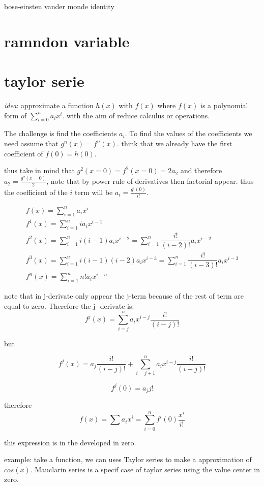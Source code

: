 \documentclass[10pt,a4paper]{article}
\begin{document}
bose-einsten
vander monde identity 


\section{ramndon variable }




\section{taylor serie}
\emph{idea}: approximate a function $h(x)$
with $f(x)$ where $f(x)$ is  a polynomial form of $\sum_{i=0}^{n} a_{i}x^{i}$. with the aim of reduce calculus or operations.

The challenge is find the coefficients $a_{i}$. To find the  values of the coefficients  we need assume that $g^{n}(x) = f^{n}(x)$. think that we already have the first coefficient of $f(0) = h(0)$.


thus take in mind that $g^{2}(x=0) = f^{2}(x=0) = 2a_{2}$ and therefore $a_{2} = \frac{ g^{2}(x=0) }{2}$, note that by power rule of derivatives then factorial appear.
thus the coefficient of the $i$ term will be $a_{i} = \frac{g^{i}(0)}{i!}$.


\begin{eqnarray}
f(x)=\sum_{i=1}^{n} a_{i}x^{i} \\
f^{1}(x)=\sum_{i=1}^{n} i a_{i}x^{i-1} \\
f^{2}(x)=\sum_{i=1}^{n} i(i-1) a_{i}x^{i-2} = \sum_{i=1}^{n} \dfrac{i!}{(i-2)!} a_{i}x^{i-2} \\
f^{3}(x)=\sum_{i=1}^{n} i(i-1)(i-2) a_{i}x^{i-3} = 
\sum_{i=1}^{n} \dfrac{i!}{(i-3)!} a_{i}x^{i-3} \\
f^{n}(x)= \sum_{i=1}^{n} n! a_{i}x^{i-n}
\end{eqnarray}

note that in j-derivate only appear the j-term because of the rest of term are equal to zero. Therefore the j- derivate is:
$$ f^{j}(x)=\sum_{i=j}^{n} a_{i}x^{i-j} \dfrac{i!}{(i-j)!}$$

but 

$$f^{j}(x)=a_{j} \dfrac{i!}{(i-j)!} + \sum_{i=j+1}^{n} a_{i}x^{i-j} \dfrac{i!}{(i-j)!}$$


$$ f^{j}(0)=a_{j} j!$$

therefore
 $$f(x)=\sum a_{i}x^{i}=\sum_{i=0}^{n}f^{i}(0) \dfrac{x^{i}}{i!}$$
 
 this expression is in the  developed in zero.
 
 
example:
take a function, we can uses Taylor series to make a approximation of $cos(x)$.
Mauclarin series is a specif case of taylor series using the value center in zero.
\end{document}
